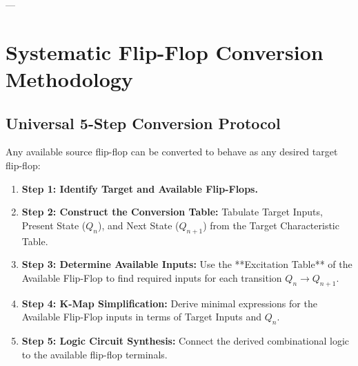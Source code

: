 ---

\section{Systematic Flip-Flop Conversion Methodology}

\subsection{Universal 5-Step Conversion Protocol}
Any available source flip-flop can be converted to behave as any desired target flip-flop:
\begin{enumerate}
    \item \textbf{Step 1: Identify Target and Available Flip-Flops.}
    \item \textbf{Step 2: Construct the Conversion Table:} Tabulate Target Inputs, Present State ($Q_n$), and Next State ($Q_{n+1}$) from the Target Characteristic Table.
    \item \textbf{Step 3: Determine Available Inputs:} Use the **Excitation Table** of the Available Flip-Flop to find required inputs for each transition $Q_n \rightarrow Q_{n+1}$.
    \item \textbf{Step 4: K-Map Simplification:} Derive minimal expressions for the Available Flip-Flop inputs in terms of Target Inputs and $Q_n$.
    \item \textbf{Step 5: Logic Circuit Synthesis:} Connect the derived combinational logic to the available flip-flop terminals.
\end{enumerate}

